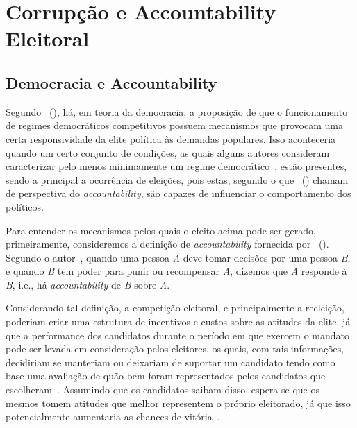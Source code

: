 \documentclass[
	12pt,				%
	openright,			%
	twoside,			%
	a4paper,			%
	openany,
	english,			%
	brazil				%
	]{abntex2}
\begin{document}

\chapter{Corrupção e Accountability Eleitoral}

\section{Democracia e Accountability}

Segundo ~(\citeyear{manin1999elections}), há, em teoria da democracia, a proposição de que o funcionamento de regimes democráticos competitivos possuem mecanismos que provocam uma certa responsividade da elite política às demandas populares. Isso aconteceria quando um certo conjunto de condições, as quais alguns autores consideram caracterizar pelo menos minimamente um regime democrático~\cite{przeworski19992}, estão presentes, sendo a principal a ocorrência de eleições, pois estas, segundo o que ~(\citeyear{manin1999elections}) chamam de perspectiva do \textit{accountability}, são capazes de influenciar o comportamento dos políticos.

Para entender os mecanismos pelos quais o efeito acima pode ser gerado, primeiramente, consideremos a definição de \textit{accountability} fornecida por ~(\citeyear{fearon1999electoral}). Segundo o autor~\cite{fearon1999electoral}, quando uma pessoa \textit{A} deve tomar decisões por uma pessoa \textit{B}, e quando \textit{B} tem poder para punir ou recompensar \textit{A}, dizemos que \textit{A} responde à \textit{B}, i.e., há \textit{accountability} de \textit{B} sobre \textit{A}.

Considerando tal definição, a competição eleitoral, e principalmente a reeleição, poderiam criar uma estrutura de incentivos e custos sobre as atitudes da elite, já que a performance dos candidatos durante o período em que exercem o mandato pode ser levada em consideração pelos eleitores, os quais, com tais informações, decidiriam se manteriam ou deixariam de suportar um candidato tendo como base uma avaliação de quão bem foram representados pelos candidatos que escolheram~\cite{manin1999elections}. Assumindo que os candidatos saibam disso, espera-se que os mesmos tomem atitudes que melhor representem o próprio eleitorado, já que isso potencialmente aumentaria as chances de vitória~\cite{manin1999elections}.
\end{document}
